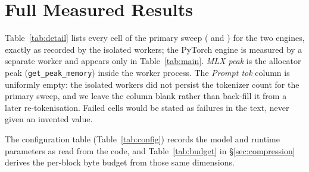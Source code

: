 \section{Full Measured Results}
\label{app:tables}

\begin{sloppypar}
Table~\ref{tab:detail} lists every cell of the primary sweep
( and ) for the two \mlxe{} engines,
exactly as recorded by the isolated workers; the PyTorch engine is measured by a separate worker
and appears only in Table~\ref{tab:main}. \emph{MLX peak} is the allocator peak
(\texttt{get\_peak\_memory}) inside the worker process. The \emph{Prompt tok} column is
uniformly empty: the isolated workers did not persist the tokenizer count for the primary sweep,
and we leave the column blank rather than back-fill it from a later re-tokenisation. Failed cells
would be stated as failures in the text, never given an invented value.
\end{sloppypar}

\begin{table}[h]
\centering
\caption{Per-run detail for the primary sweep: \dkv{} (active) and the optimized \texttt{mlx\_lm}
dense baseline on identical int4 weights. All values measured.}
\label{tab:detail}
\small
{}
\end{table}

\noindent The configuration table (Table~\ref{tab:config}) records the model and runtime
parameters as read from the code, and Table~\ref{tab:budget} in \S\ref{sec:compression} derives the
per-block byte budget from those same dimensions.

\begin{table}[h]
\centering
\caption{Model and \dkv{} configuration, as measured/loaded by the runtime.}
\label{tab:config}
\small

\end{table}
